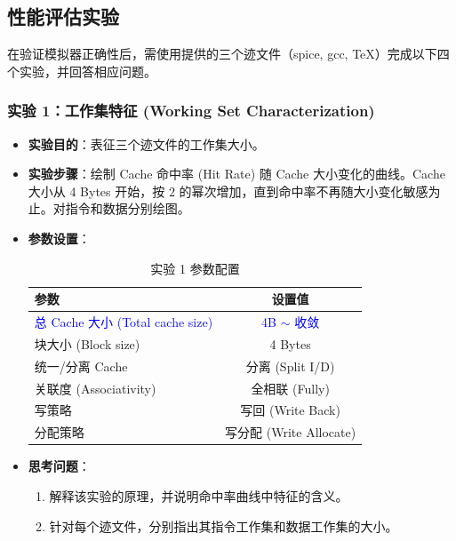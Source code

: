 \documentclass[12pt,a4paper]{article}
\begin{document}
\clearpage
\subsection{性能评估实验}

在验证模拟器正确性后，需使用提供的三个迹文件（spice, gcc, TeX）完成以下四个实验，并回答相应问题。

\subsubsection{实验 1：工作集特征 (Working Set Characterization)}
\begin{itemize}
    \item \textbf{实验目的}：表征三个迹文件的工作集大小。
    \item \textbf{实验步骤}：绘制 Cache 命中率 (Hit Rate) 随 Cache 大小变化的曲线。Cache 大小从 4 Bytes 开始，按 $2$ 的幂次增加，直到命中率不再随大小变化敏感为止。对指令和数据分别绘图。
    \item \textbf{参数设置}：
    
    \begin{table}[H]
    \centering
    \small
    \begin{tabular}{lc}
    \toprule
    \textbf{参数} & \textbf{设置值} \\
    \midrule
    \textcolor{blue}{总 Cache 大小 (Total cache size)} & \textcolor{blue}{4B $\sim$ 收敛} \\
    块大小 (Block size) & 4 Bytes \\
    统一/分离 Cache & 分离 (Split I/D) \\
    关联度 (Associativity) & 全相联 (Fully) \\
    写策略 & 写回 (Write Back) \\
    分配策略 & 写分配 (Write Allocate) \\
    \bottomrule
    \end{tabular}
    \caption{实验 1 参数配置}
    \end{table}
    \item \textbf{思考问题}：
    \begin{enumerate}
        \item 解释该实验的原理，并说明命中率曲线中特征的含义。
        \item 针对每个迹文件，分别指出其指令工作集和数据工作集的大小。
    \end{enumerate}
\end{itemize}
\end{document}
